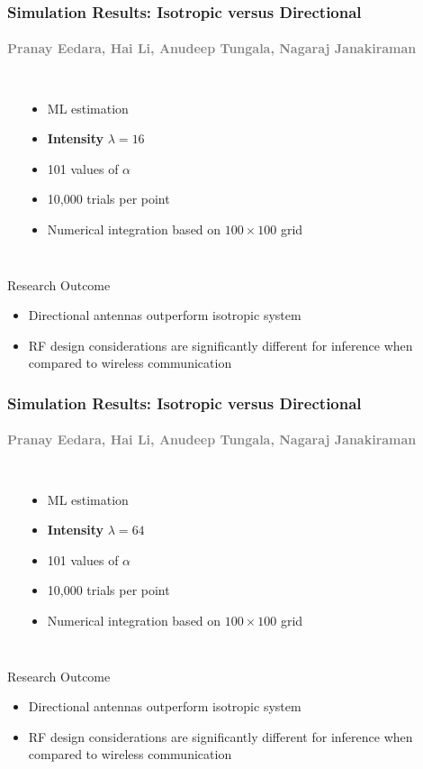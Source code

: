 \documentclass{beamer}
\begin{document}
\begin{frame}
\frametitle{Simulation Results: Isotropic versus Directional}
\framesubtitle{\textcolor{gray}{\scriptsize Pranay Eedara, Hai Li, Anudeep Tungala, Nagaraj Janakiraman}}
\begin{columns}
  \begin{center}
  \scalebox{0.65}{}
  \end{center}
  \begin{itemize}
  \item ML estimation
  \item \textbf{Intensity} $\lambda = 16$
  \item 101 values of $\alpha$
  \item 10,000 trials per point
  \item Numerical integration based on $100 \times 100$ grid
  \end{itemize}
\end{columns}
\vfill
\begin{block}{Research Outcome}
  \begin{itemize}
  \item Directional antennas outperform isotropic system
  \item RF design considerations are significantly different for inference when compared to wireless communication
  \end{itemize}
\end{block}
\end{frame}

\begin{frame}
\frametitle{Simulation Results: Isotropic versus Directional}
\framesubtitle{\textcolor{gray}{\scriptsize Pranay Eedara, Hai Li, Anudeep Tungala, Nagaraj Janakiraman}}
\begin{columns}
  \begin{center}
  \scalebox{0.65}{}
  \end{center}
  \begin{itemize}
  \item ML estimation
  \item \textbf{Intensity} $\lambda = 64$
  \item 101 values of $\alpha$
  \item 10,000 trials per point
  \item Numerical integration based on $100 \times 100$ grid
  \end{itemize}
\end{columns}
\vfill
\begin{block}{Research Outcome}
  \begin{itemize}
  \item Directional antennas outperform isotropic system
  \item RF design considerations are significantly different for inference when compared to wireless communication
  \end{itemize}
\end{block}
\end{frame}
\end{document}
